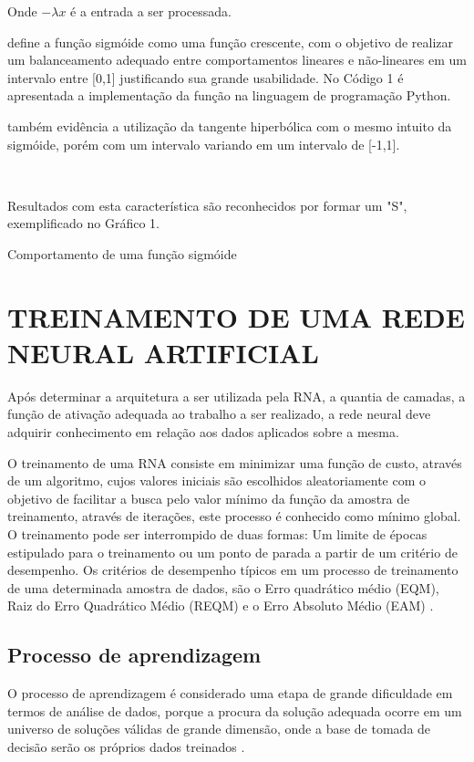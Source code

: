 Onde $- \lambda x$ é a entrada a ser processada.

 define a função sigmóide como uma função crescente, com o  objetivo de realizar um balanceamento adequado entre comportamentos lineares e não-lineares em um intervalo entre [0,1] justificando sua grande usabilidade. No Código 1 é apresentada a implementação da função na linguagem de programação Python.

 também evidência a utilização da tangente hiperbólica com o mesmo intuito da sigmóide, porém com um intervalo variando em um intervalo de [-1,1].

\codigoPython\


Resultados com esta característica são reconhecidos por formar um "S", exemplificado no Gráfico 1.

\begin{grafico}[h]
	\centering
	\caption{Comportamento de uma função sigmóide}
	\label{sigmoide-graph}
\end{grafico}


\section{TREINAMENTO DE UMA REDE NEURAL ARTIFICIAL}\label{sec:rna-treinamento}
Após determinar a arquitetura a ser utilizada pela RNA, a quantia de camadas, a função de ativação adequada ao trabalho a ser realizado, a rede neural deve adquirir conhecimento em relação aos dados aplicados sobre a mesma.

O treinamento de uma RNA consiste em minimizar uma função de custo, através de um algoritmo, cujos valores iniciais são escolhidos aleatoriamente com o objetivo de facilitar a busca  pelo valor mínimo da função da amostra de treinamento, através de iterações, este processo é conhecido como mínimo global. O treinamento pode ser interrompido de duas formas: Um limite de épocas estipulado para o treinamento ou um ponto de parada a partir de um critério de desempenho. Os critérios de desempenho típicos em um processo de treinamento de uma determinada amostra de dados, são o Erro quadrático médio (EQM), Raiz do Erro Quadrático Médio (REQM) e o Erro Absoluto Médio (EAM) \cite{gambogi}. 

\subsection{Processo de aprendizagem}
O processo de aprendizagem é considerado uma etapa de grande dificuldade em termos de análise de dados, porque a procura da solução adequada ocorre em um universo de soluções válidas de grande dimensão, onde a base de tomada de decisão serão os próprios dados treinados \cite{medeiros}.
 

